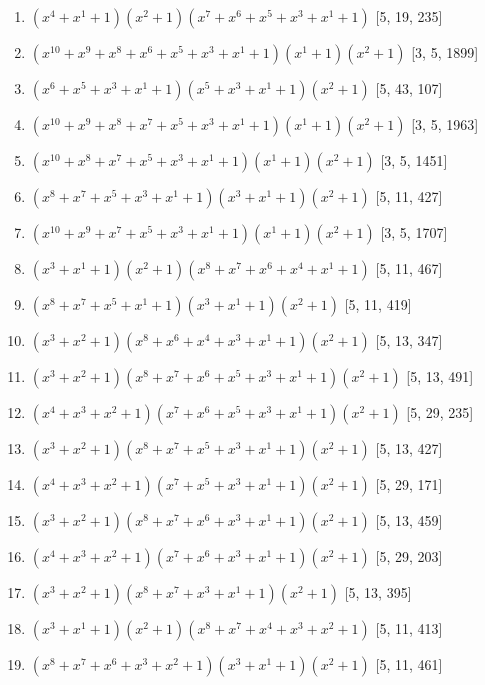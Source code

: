 \documentclass[10pt,twocolumn]{article}
\begin{document}
\begin{enumerate}
\item $(x^{4} + x^{1} + 1)(x^{2} + 1)(x^{7} + x^{6} + x^{5} + x^{3} + x^{1} + 1)$  [5, 19, 235]
\item $(x^{10} + x^{9} + x^{8} + x^{6} + x^{5} + x^{3} + x^{1} + 1)(x^{1} + 1)(x^{2} + 1)$  [3, 5, 1899]
\item $(x^{6} + x^{5} + x^{3} + x^{1} + 1)(x^{5} + x^{3} + x^{1} + 1)(x^{2} + 1)$  [5, 43, 107]
\item $(x^{10} + x^{9} + x^{8} + x^{7} + x^{5} + x^{3} + x^{1} + 1)(x^{1} + 1)(x^{2} + 1)$  [3, 5, 1963]
\item $(x^{10} + x^{8} + x^{7} + x^{5} + x^{3} + x^{1} + 1)(x^{1} + 1)(x^{2} + 1)$  [3, 5, 1451]
\item $(x^{8} + x^{7} + x^{5} + x^{3} + x^{1} + 1)(x^{3} + x^{1} + 1)(x^{2} + 1)$  [5, 11, 427]
\item $(x^{10} + x^{9} + x^{7} + x^{5} + x^{3} + x^{1} + 1)(x^{1} + 1)(x^{2} + 1)$  [3, 5, 1707]
\item $(x^{3} + x^{1} + 1)(x^{2} + 1)(x^{8} + x^{7} + x^{6} + x^{4} + x^{1} + 1)$  [5, 11, 467]
\item $(x^{8} + x^{7} + x^{5} + x^{1} + 1)(x^{3} + x^{1} + 1)(x^{2} + 1)$  [5, 11, 419]
\item $(x^{3} + x^{2} + 1)(x^{8} + x^{6} + x^{4} + x^{3} + x^{1} + 1)(x^{2} + 1)$  [5, 13, 347]
\item $(x^{3} + x^{2} + 1)(x^{8} + x^{7} + x^{6} + x^{5} + x^{3} + x^{1} + 1)(x^{2} + 1)$  [5, 13, 491]
\item $(x^{4} + x^{3} + x^{2} + 1)(x^{7} + x^{6} + x^{5} + x^{3} + x^{1} + 1)(x^{2} + 1)$  [5, 29, 235]
\item $(x^{3} + x^{2} + 1)(x^{8} + x^{7} + x^{5} + x^{3} + x^{1} + 1)(x^{2} + 1)$  [5, 13, 427]
\item $(x^{4} + x^{3} + x^{2} + 1)(x^{7} + x^{5} + x^{3} + x^{1} + 1)(x^{2} + 1)$  [5, 29, 171]
\item $(x^{3} + x^{2} + 1)(x^{8} + x^{7} + x^{6} + x^{3} + x^{1} + 1)(x^{2} + 1)$  [5, 13, 459]
\item $(x^{4} + x^{3} + x^{2} + 1)(x^{7} + x^{6} + x^{3} + x^{1} + 1)(x^{2} + 1)$  [5, 29, 203]
\item $(x^{3} + x^{2} + 1)(x^{8} + x^{7} + x^{3} + x^{1} + 1)(x^{2} + 1)$  [5, 13, 395]
\item $(x^{3} + x^{1} + 1)(x^{2} + 1)(x^{8} + x^{7} + x^{4} + x^{3} + x^{2} + 1)$  [5, 11, 413]
\item $(x^{8} + x^{7} + x^{6} + x^{3} + x^{2} + 1)(x^{3} + x^{1} + 1)(x^{2} + 1)$  [5, 11, 461]

\end{enumerate}
\end{document}
